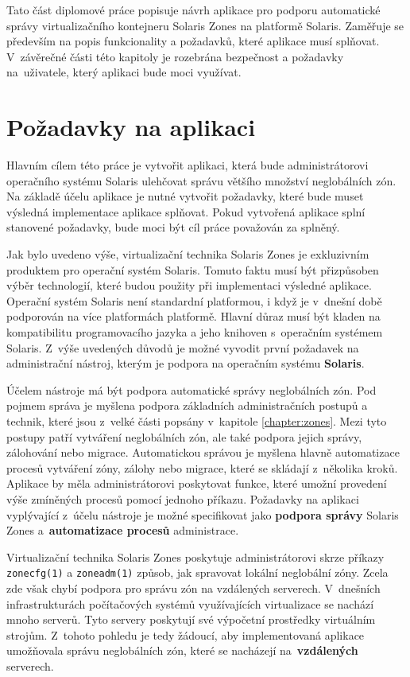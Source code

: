 \label{chapter:design}
Tato část diplomové práce popisuje návrh aplikace pro podporu automatické správy virtualizačního kontejneru Solaris Zones na
platformě Solaris. Zaměřuje se především na popis funkcionality a požadavků, které aplikace musí splňovat. V~závěrečné části
této kapitoly je rozebrána bezpečnost a požadavky na~uživatele, který aplikaci bude moci využívat.
\section{Požadavky na aplikaci}
\label{chapter:design:demands}
Hlavním cílem této práce je vytvořit aplikaci, která bude administrátorovi operačního systému Solaris ulehčovat správu
většího množství neglobálních zón. Na základě účelu aplikace je nutné vytvořit požadavky, které bude muset výsledná implementace
aplikace splňovat. Pokud vytvořená aplikace splní stanovené požadavky, bude moci být cíl práce považován za splněný.

Jak bylo uvedeno výše, virtualizační technika Solaris Zones je exkluzivním produktem pro operační
systém Solaris. Tomuto faktu musí být přizpůsoben výběr technologií, které budou použity při implementaci výsledné aplikace.
Operační systém Solaris není standardní platformou, i když je v~dnešní době podporován na více platformách platformě. Hlavní důraz
musí být kladen na kompatibilitu programovacího jazyka a jeho knihoven s~operačním systémem Solaris. Z~výše uvedených důvodů
je možné vyvodit první požadavek na administrační nástroj, kterým je podpora na operačním systému \textbf{Solaris}.

Účelem nástroje má být podpora automatické správy neglobálních zón. Pod pojmem správa je myšlena podpora základních administračních
postupů a technik, které jsou z~velké části popsány v~kapitole \ref{chapter:zones}. Mezi tyto postupy patří 
vytváření neglobálních zón, ale také podpora jejich správy, zálohování nebo migrace. Automatickou správou je myšlena hlavně
automatizace procesů vytváření zóny, zálohy nebo migrace, které se skládají z~několika kroků. Aplikace by měla administrátorovi
poskytovat funkce, které umožní provedení výše zmíněných procesů pomocí jednoho příkazu. Požadavky na aplikaci vyplývající
z~účelu nástroje je možné specifikovat jako \textbf{podpora správy} Solaris Zones a~\textbf{automatizace procesů} administrace.

Virtualizační technika Solaris Zones poskytuje administrátorovi skrze příkazy \verb|zonecfg(1)| a \verb|zoneadm(1)| způsob,
jak spravovat lokální neglobální zóny. Zcela zde však chybí podpora pro správu zón na vzdálených serverech. V~dnešních infrastrukturách
počítačových systémů využívajících virtualizace se nachází mnoho serverů. Tyto servery poskytují své výpočetní prostředky
virtuálním strojům. Z~tohoto pohledu je tedy žádoucí, aby implementovaná aplikace umožňovala správu neglobálních zón, které
se nacházejí na~\textbf{vzdálených} serverech.

